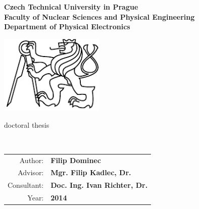 
\begin{center}
\textbf{
Czech Technical University in Prague\\
Faculty of Nuclear Sciences and Physical Engineering\\ 
Department of Physical Electronics\\
 }
 \vspace{1cm}

\includegraphics[width=5cm]{img/LogoCVUT}
\vspace{4cm}

\large{doctoral thesis}
\vspace{5mm}

\textbf{\huge \WorkTitle\\}
\end{center}

\date{ } 			
 
 \vfill
 \begin{tabular}{rl}
  Author: 	&\textbf{Filip Dominec}\\
  Advisor: 	&\textbf{Mgr. Filip Kadlec, Dr.}\\
  Consultant: 	&\textbf{Doc. Ing. Ivan Richter, Dr.}\\ 
  Year:		&\textbf{2014}\\
  \end{tabular}

\thispagestyle{empty}

\tableofcontents

